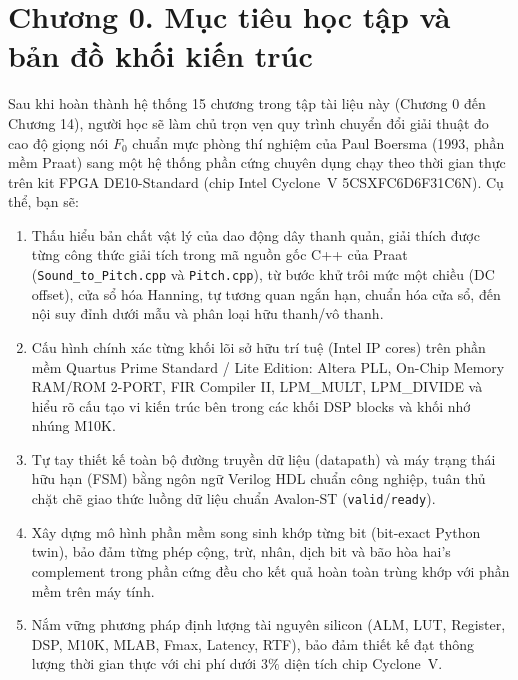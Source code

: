 \clearpage
{}
\section*{Chương 0. Mục tiêu học tập và bản đồ khối kiến trúc}

\begin{learningobj}
Sau khi hoàn thành hệ thống 15 chương trong tập tài liệu này (Chương 0 đến Chương 14), người học sẽ làm chủ trọn vẹn quy trình chuyển đổi giải thuật đo cao độ giọng nói $F_0$ chuẩn mực phòng thí nghiệm của Paul Boersma (1993, phần mềm Praat) sang một hệ thống phần cứng chuyên dụng chạy theo thời gian thực trên kit FPGA DE10-Standard (chip Intel Cyclone~V 5CSXFC6D6F31C6N). Cụ thể, bạn sẽ:
\begin{enumerate}[leftmargin=1.4em]
    \item Thấu hiểu bản chất vật lý của dao động dây thanh quản, giải thích được từng công thức giải tích trong mã nguồn gốc C++ của Praat (\texttt{Sound\_to\_Pitch.cpp} và \texttt{Pitch.cpp}), từ bước khử trôi mức một chiều (DC offset), cửa sổ hóa Hanning, tự tương quan ngắn hạn, chuẩn hóa cửa sổ, đến nội suy đỉnh dưới mẫu và phân loại hữu thanh/vô thanh.
    \item Cấu hình chính xác từng khối lõi sở hữu trí tuệ (Intel IP cores) trên phần mềm Quartus Prime Standard / Lite Edition: Altera PLL, On-Chip Memory RAM/ROM 2-PORT, FIR Compiler II, LPM\_MULT, LPM\_DIVIDE và hiểu rõ cấu tạo vi kiến trúc bên trong các khối DSP blocks và khối nhớ nhúng M10K.
    \item Tự tay thiết kế toàn bộ đường truyền dữ liệu (datapath) và máy trạng thái hữu hạn (FSM) bằng ngôn ngữ Verilog HDL chuẩn công nghiệp, tuân thủ chặt chẽ giao thức luồng dữ liệu chuẩn Avalon-ST (\texttt{valid}/\texttt{ready}).
    \item Xây dựng mô hình phần mềm song sinh khớp từng bit (bit-exact Python twin), bảo đảm từng phép cộng, trừ, nhân, dịch bit và bão hòa hai's complement trong phần cứng đều cho kết quả hoàn toàn trùng khớp với phần mềm trên máy tính.
    \item Nắm vững phương pháp định lượng tài nguyên silicon (ALM, LUT, Register, DSP, M10K, MLAB, Fmax, Latency, RTF), bảo đảm thiết kế đạt thông lượng thời gian thực với chi phí dưới $3\%$ diện tích chip Cyclone~V.
\end{enumerate}
\end{learningobj}

